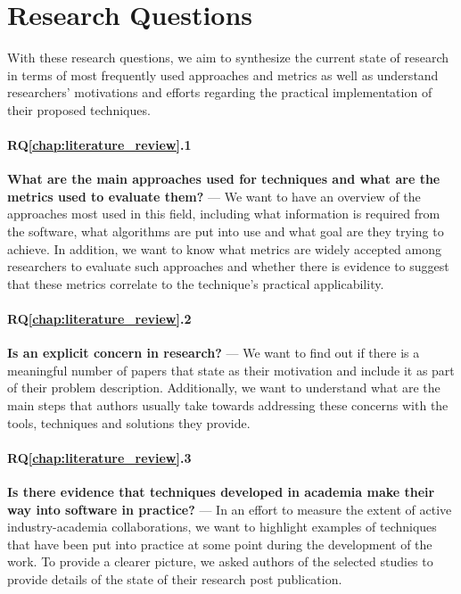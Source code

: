 \section{Research Questions}\label{sec:lit_rqs}

With these research questions, we aim to synthesize the current state of \rt research in terms of most frequently used approaches and metrics as well as understand researchers' motivations and efforts regarding the practical implementation of their proposed techniques.

\paragraph{RQ\ref{chap:literature_review}.1}\label{rq:lit1}\textbf{What are the main approaches used for \rt techniques and what are the metrics used to evaluate them?} --- We want to have an overview of the approaches most used in this field, including what information is required from the software, what algorithms are put into use and what goal are they trying to achieve. In addition, we want to know what metrics are widely accepted among researchers to evaluate such approaches and whether there is evidence to suggest that these metrics correlate to the technique's practical applicability.

\paragraph{RQ\ref{chap:literature_review}.2}\label{rq:lit2}\textbf{Is \rea an explicit concern in \rt research?} --- We want to find out if there is a meaningful number of papers that state \rea as their motivation and include it as part of their problem description. Additionally, we want to understand what are the main steps that authors usually take towards addressing these concerns with the tools, techniques and solutions they provide.
    
\paragraph{RQ\ref{chap:literature_review}.3}\label{rq:lit3}\textbf{Is there evidence that techniques developed in academia make their way into software in practice?} --- In an effort to measure the extent of active industry-academia collaborations, we want to highlight examples of techniques that have been put into practice at some point during the development of the work. To provide a clearer picture, we asked authors of the selected studies to provide details of the state of their research post publication.